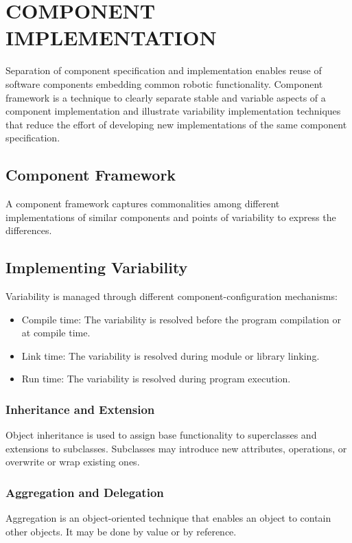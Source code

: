\documentclass[letterpaper, 10 pt, conference]{ieeeconf}
\begin{document}
\section{COMPONENT IMPLEMENTATION}
Separation of component specification and implementation enables reuse of software components embedding common robotic functionality.
Component framework is a technique to clearly separate stable and variable aspects of a component implementation and illustrate variability implementation techniques that reduce the effort of developing new implementations of the same component specification.

\subsection{Component Framework}
A component framework captures commonalities among different implementations of similar components and points of variability to express the differences.

\subsection{Implementing Variability}
Variability is managed through different component-configuration mechanisms:
\begin{itemize}
\item Compile time: The variability is resolved before the program compilation or at compile time.
\item Link time: The variability is resolved during module or library linking. 
\item Run time: The variability is resolved during program execution.
\end{itemize}

\subsubsection{Inheritance and Extension}
Object inheritance is used to assign base functionality to superclasses and extensions to subclasses. Subclasses may introduce new attributes, operations, or overwrite or wrap existing ones.

\subsubsection{Aggregation and Delegation}
Aggregation is an object-oriented technique that enables an object to contain other objects. It may be done by value or by reference.
\end{document}
